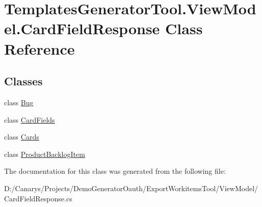 \hypertarget{class_templates_generator_tool_1_1_view_model_1_1_card_field_response}{}\section{Templates\+Generator\+Tool.\+View\+Model.\+Card\+Field\+Response Class Reference}
\label{class_templates_generator_tool_1_1_view_model_1_1_card_field_response}
\subsection*{Classes}
\begin{DoxyCompactItemize}
\item 
class \mbox{\hyperlink{class_templates_generator_tool_1_1_view_model_1_1_card_field_response_1_1_bug}{Bug}}
\item 
class \mbox{\hyperlink{class_templates_generator_tool_1_1_view_model_1_1_card_field_response_1_1_card_fields}{Card\+Fields}}
\item 
class \mbox{\hyperlink{class_templates_generator_tool_1_1_view_model_1_1_card_field_response_1_1_cards}{Cards}}
\item 
class \mbox{\hyperlink{class_templates_generator_tool_1_1_view_model_1_1_card_field_response_1_1_product_backlog_item}{Product\+Backlog\+Item}}
\end{DoxyCompactItemize}


The documentation for this class was generated from the following file\+:\begin{DoxyCompactItemize}
\item 
D\+:/\+Canarys/\+Projects/\+Demo\+Generator\+Oauth/\+Export\+Workitems\+Tool/\+View\+Model/Card\+Field\+Response.\+cs\end{DoxyCompactItemize}

